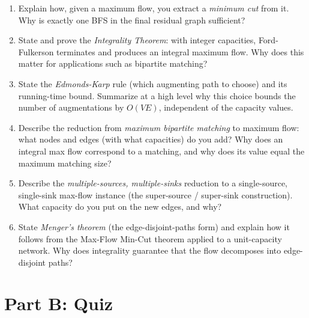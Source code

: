 \documentclass[11pt]{article}
\begin{document}
\begin{enumerate}[label=\textbf{A\arabic*.}, leftmargin=2.2em]
\item Explain how, given a maximum flow, you extract a \emph{minimum cut} from it. Why is
exactly one BFS in the final residual graph sufficient?

\item State and prove the \emph{Integrality Theorem}: with integer capacities,
Ford-Fulkerson terminates and produces an integral maximum flow. Why does this matter for
applications such as bipartite matching?

\item State the \emph{Edmonds-Karp} rule (which augmenting path to choose) and its
running-time bound. Summarize at a high level why this choice bounds the number of
augmentations by $O(VE)$, independent of the capacity values.

\item Describe the reduction from \emph{maximum bipartite matching} to maximum flow:
what nodes and edges (with what capacities) do you add? Why does an integral max flow
correspond to a matching, and why does its value equal the maximum matching size?

\item Describe the \emph{multiple-sources, multiple-sinks} reduction to a single-source,
single-sink max-flow instance (the super-source / super-sink construction). What capacity
do you put on the new edges, and why?

\item State \emph{Menger's theorem} (the edge-disjoint-paths form) and explain how it
follows from the Max-Flow Min-Cut theorem applied to a unit-capacity network. Why does
integrality guarantee that the flow decomposes into edge-disjoint paths?

\end{enumerate}

\newpage
\section*{Part B: Quiz}
\end{document}
